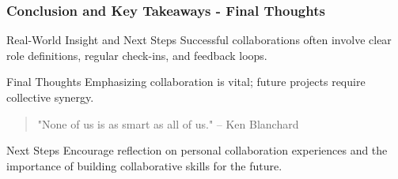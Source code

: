 \documentclass[aspectratio=169]{beamer}
\begin{document}
\begin{frame}[fragile]
    \frametitle{Conclusion and Key Takeaways - Final Thoughts}
    \begin{block}{Real-World Insight and Next Steps}
        Successful collaborations often involve clear role definitions, regular check-ins, and feedback loops.
    \end{block}
    \begin{block}{Final Thoughts}
        Emphasizing collaboration is vital; future projects require collective synergy. 
        \begin{quote}
            "None of us is as smart as all of us." – Ken Blanchard
        \end{quote}
    \end{block}
    \begin{block}{Next Steps}
        Encourage reflection on personal collaboration experiences and the importance of building collaborative skills for the future.
    \end{block}
\end{frame}
\end{document}
